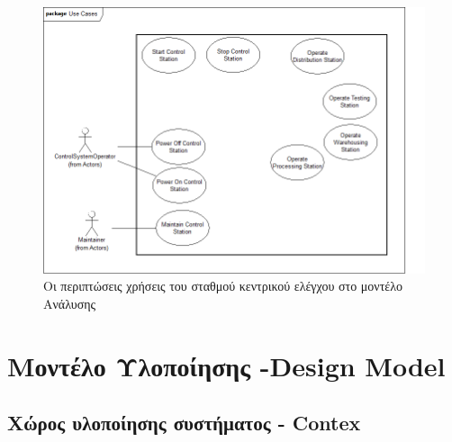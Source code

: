 \documentclass[a4paper,12pt,twoside]{report}
\begin{document}
\begin{appendices}
			\clearpage
			\begin{figure}[hp]
					\centering
					\includegraphics[scale=0.30]{AnalysisModel_uc-CentralControlStationsUseCases.png}
					\caption{Οι περιπτώσεις χρήσεις του σταθμού κεντρικού ελέγχου στο μοντέλο Ανάλυσης}
					\label{φωτ:Οι περιπτώσεις χρήσεις του σταθμού κεντρικού ελέγχου στο μοντέλο Ανάλυσης}
			\end{figure}
		
		\FloatBarrier
		\section{Μοντέλο Υλοποίησης  -Design Model}
		
			\FloatBarrier
			\subsection{Χώρος υλοποίησης συστήματος - Contex}
			

\end{appendices}
\end{document}
